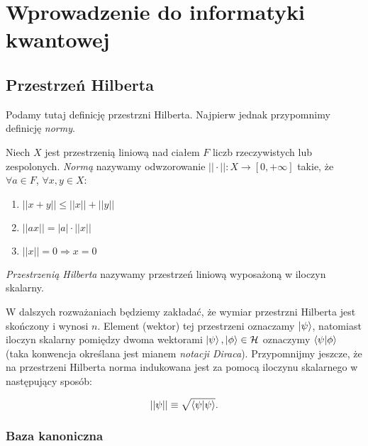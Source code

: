 \section{Wprowadzenie do informatyki kwantowej}

\subsection{Przestrzeń Hilberta}

Podamy tutaj definicję przestrzni Hilberta. Najpierw jednak przypomnimy definicję \textit{normy}.

\begin{definition}[Norma]
    Niech $X$ jest przestrzenią liniową nad ciałem $F$ liczb rzeczywistych lub zespolonych. \textit{Normą} nazywamy odwzorowanie $||\cdot||: X \rightarrow [0, + \infty]$ takie, że $\forall a \in F$, $\forall x, y \in X$:

    \begin{enumerate}
        \item $||x + y|| \leq ||x|| + ||y||$
        \item $||a x|| = |a| \cdot ||x||$
        \item $||x|| = 0 \Rightarrow x = 0$
    \end{enumerate}
\end{definition}

\begin{definition}
    \textit{Przestrzenią Hilberta} nazywamy przestrzeń liniową wyposażoną w iloczyn skalarny.
\end{definition}

W dalszych rozważaniach będziemy zakładać, że wymiar przestrzni Hilberta jest skończony i wynosi $n$. Element (wektor) tej przestrzeni oznaczamy $\ket{\psi}$, natomiast iloczyn skalarny pomiędzy dwoma wektorami $\ket{\psi}, \ket{\phi} \in \mathcal{H}$ oznaczymy $\bra{\psi}\ket{\phi}$ (taka konwencja określana jest mianem \textit{notacji Diraca}). Przypomnijmy jeszcze, że na przestrzeni Hilberta norma indukowana jest za pomocą iloczynu skalarnego w następujący sposób:

\begin{equation}\label{equation:norm}
    ||\psi|| \equiv \sqrt{\bra{\psi}\ket{\psi}}.
\end{equation}

\subsubsection{Baza kanoniczna}

